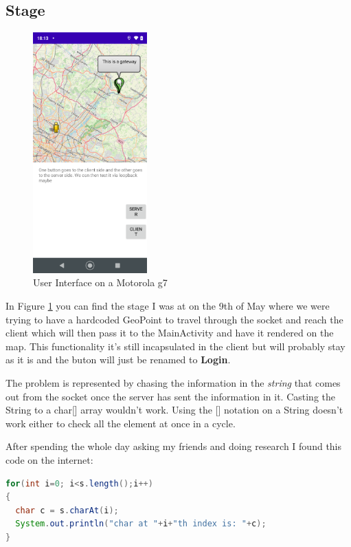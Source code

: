\documentclass[a4paper,12pt]{book}
\begin{document}
\clearpage

\subsection{Stage}

\begin{figure}
\includegraphics[width=4.4cm]{./current_status_g7.PNG}
\caption{User Interface on a Motorola g7}\label{fig:User-Interface-g7}
\end{figure}

In Figure \ref{fig:User-Interface-g7} you can find the stage I was at on the 9th of May where we were trying to have a hardcoded GeoPoint to travel through the socket and reach the client which will then pass it to the MainActivity and have it rendered on the map. This functionality it's still incapsulated in the client but will probably stay as it is and the buton will just be renamed to \textbf{Login}.

The problem is represented by chasing the information in the \emph{string} that comes out from the socket once the server has sent the information in it. Casting the String to a char[] array wouldn't work. Using the [] notation on a String doesn't work either to check all the element at once in a cycle. 


After spending the whole day asking my friends and doing research I found this code on the internet:

\begin{lstlisting}[language=java]
for(int i=0; i<s.length();i++)
{
  char c = s.charAt(i);
  System.out.println("char at "+i+"th index is: "+c);
}
\end{lstlisting}
\end{document}
